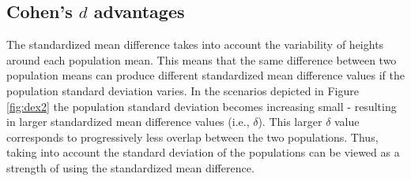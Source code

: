 \documentclass[
]{krantz}
\begin{document}
\hypertarget{cohens-d-advantages}{%
\subsection{\texorpdfstring{Cohen's \(d\) advantages}{Cohen's d advantages}}\label{cohens-d-advantages}}

The standardized mean difference takes into account the variability of heights around each population mean. This means that the same difference between two population means can produce different standardized mean difference values if the population standard deviation varies. In the scenarios depicted in Figure \ref{fig:dex2} the population standard deviation becomes increasing small - resulting in larger standardized mean difference values (i.e., \(\delta\)). This larger \(\delta\) value corresponds to progressively less overlap between the two populations. Thus, taking into account the standard deviation of the populations can be viewed as a strength of using the standardized mean difference.
\end{document}
